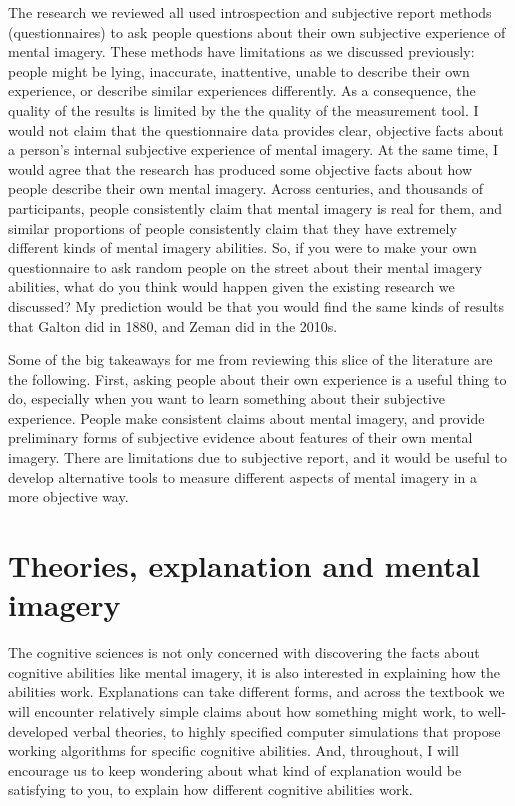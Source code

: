 \documentclass[
  oneside,
  12pt]{crumpbook}
\begin{document}
The research we reviewed all used introspection and subjective report methods (questionnaires) to ask people questions about their own subjective experience of mental imagery. These methods have limitations as we discussed previously: people might be lying, inaccurate, inattentive, unable to describe their own experience, or describe similar experiences differently. As a consequence, the quality of the results is limited by the the quality of the measurement tool. I would not claim that the questionnaire data provides clear, objective facts about a person's internal subjective experience of mental imagery. At the same time, I would agree that the research has produced some objective facts about how people describe their own mental imagery. Across centuries, and thousands of participants, people consistently claim that mental imagery is real for them, and similar proportions of people consistently claim that they have extremely different kinds of mental imagery abilities. So, if you were to make your own questionnaire to ask random people on the street about their mental imagery abilities, what do you think would happen given the existing research we discussed? My prediction would be that you would find the same kinds of results that Galton did in 1880, and Zeman did in the 2010s.

Some of the big takeaways for me from reviewing this slice of the literature are the following. First, asking people about their own experience is a useful thing to do, especially when you want to learn something about their subjective experience. People make consistent claims about mental imagery, and provide preliminary forms of subjective evidence about features of their own mental imagery. There are limitations due to subjective report, and it would be useful to develop alternative tools to measure different aspects of mental imagery in a more objective way.

\hypertarget{theories-explanation-and-mental-imagery}{%
\section{Theories, explanation and mental imagery}\label{theories-explanation-and-mental-imagery}}

The cognitive sciences is not only concerned with discovering the facts about cognitive abilities like mental imagery, it is also interested in explaining how the abilities work. Explanations can take different forms, and across the textbook we will encounter relatively simple claims about how something might work, to well-developed verbal theories, to highly specified computer simulations that propose working algorithms for specific cognitive abilities. And, throughout, I will encourage us to keep wondering about what kind of explanation would be satisfying to you, to explain how different cognitive abilities work.
\end{document}
